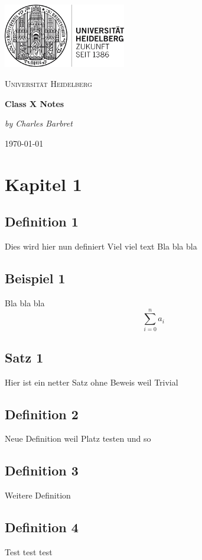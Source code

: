\documentclass[12pt,a4paper]{article} %
\begin{document}
	\begin{titlepage} %
	\centering
	\includegraphics[width=0.40\textwidth]{UniLogo}\par\vspace{1cm}
		{\scshape\LARGE Universität Heidelberg \par}
		\vspace{1cm}
		{\huge\bfseries Class X Notes \par}
		\vspace{2cm}
		{\Large\itshape by Charles Barbret \par}
		
		\vfill

		{\large \gerDate\today\par}
	\end{titlepage}

\tableofcontents %
\newpage %


\section{Kapitel 1}
\subsection{Definition 1}
Dies wird hier nun definiert
\newline
Viel viel text Bla bla bla
\subsection{Beispiel 1}
Bla bla bla
\begin{dmath}
\sum_{i = 0}^{n}a_i
\end{dmath}
\subsection{Satz 1}
Hier ist ein netter Satz ohne Beweis weil Trivial
\subsection{Definition 2}
Neue Definition weil Platz testen und so
\subsection{Definition 3}
Weitere Definition
\subsection{Definition 4}
Test test test
\end{document}
